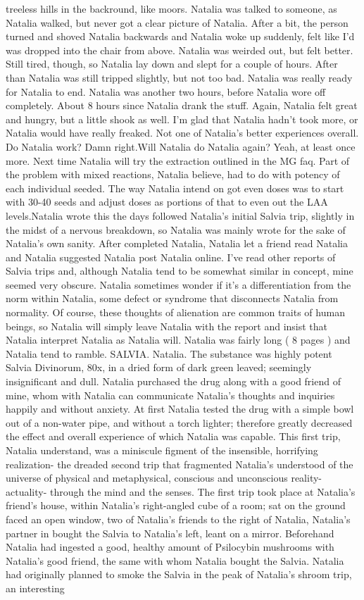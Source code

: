 \documentclass[12pt]{book}
\begin{document}
treeless hills in the backround, like moors. Natalia was talked to someone, as Natalia walked, but never got a clear picture of Natalia. After a bit, the person turned and shoved Natalia backwards and Natalia woke up suddenly, felt like I'd was dropped into the chair from above. Natalia was weirded out, but felt better. Still tired, though, so Natalia lay down and slept for a couple of hours. After than Natalia was still tripped slightly, but not too bad. Natalia was really ready for Natalia to end. Natalia was another two hours, before Natalia wore off completely. About 8 hours since Natalia drank the stuff. Again, Natalia felt great and hungry, but a little shook as well. I'm glad that Natalia hadn't took more, or Natalia would have really freaked. Not one of Natalia's better experiences overall. Do Natalia work? Damn right.Will Natalia do Natalia again? Yeah, at least once more. Next time Natalia will try the extraction outlined in the MG faq. Part of the problem with mixed reactions, Natalia believe, had to do with potency of each individual seeded. The way Natalia intend on got even doses was to start with 30-40 seeds and adjust doses as portions of that to even out the LAA levels.Natalia wrote this the days followed Natalia's initial Salvia trip, slightly in the midst of a nervous breakdown, so Natalia was mainly wrote for the sake of Natalia's own sanity. After completed Natalia, Natalia let a friend read Natalia and Natalia suggested Natalia post Natalia online. I've read other reports of Salvia trips and, although Natalia tend to be somewhat similar in concept, mine seemed very obscure. Natalia sometimes wonder if it's a differentiation from the norm within Natalia, some defect or syndrome that disconnects Natalia from normality. Of course, these thoughts of alienation are common traits of human beings, so Natalia will simply leave Natalia with the report and insist that Natalia interpret Natalia as Natalia will. Natalia was fairly long ( 8 pages ) and Natalia tend to ramble. SALVIA. Natalia. The substance was highly potent Salvia Divinorum, 80x, in a dried form of dark green leaved; seemingly insignificant and dull. Natalia purchased the drug along with a good friend of mine, whom with Natalia can communicate Natalia's thoughts and inquiries happily and without anxiety. At first Natalia tested the drug with a simple bowl out of a non-water pipe, and without a torch lighter; therefore greatly decreased the effect and overall experience of which Natalia was capable. This first trip, Natalia understand, was a miniscule figment of the insensible, horrifying realization- the dreaded second trip that fragmented Natalia's understood of the universe of physical and metaphysical, conscious and unconscious reality- actuality- through the mind and the senses. The first trip took place at Natalia's friend's house, within Natalia's right-angled cube of a room; sat on the ground faced an open window, two of Natalia's friends to the right of Natalia, Natalia's partner in bought the Salvia to Natalia's left, leant on a mirror. Beforehand Natalia had ingested a good, healthy amount of Psilocybin mushrooms with Natalia's good friend, the same with whom Natalia bought the Salvia. Natalia had originally planned to smoke the Salvia in the peak of Natalia's shroom trip, an interesting 
\end{document}
